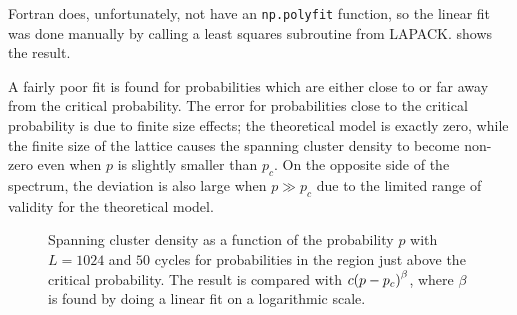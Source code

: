 \documentclass[11pt,british,a4paper]{report}
\begin{document}
Fortran does, unfortunately, not have an \lstinline{np.polyfit} function, so the linear fit was done manually by calling a least squares subroutine from LAPACK.\@ {} shows the result.

A fairly poor fit is found for probabilities which are either close to or far away from the critical probability. The error for probabilities close to the critical probability is due to finite size effects; the theoretical model is exactly zero, while the finite size of the lattice causes the spanning cluster density to become non-zero even when \(p\) is slightly smaller than \(p_c\). On the opposite side of the spectrum, the deviation is also large when \(p\gg p_c\) due to the limited range of validity for the theoretical model.

\begin{figure}[H]
    \centering
    \caption{Spanning cluster density as a function of the probability \(p\) with \(L=\num{1024}\) and \(\num{50}\) cycles for probabilities in the region just above the critical probability. The result is compared with \(c\qty(p-p_c)^\beta\), where \(\beta\) is found by doing a linear fit on a logarithmic scale. }%
    \label{fig:cP}
\end{figure}


%
\end{document}
